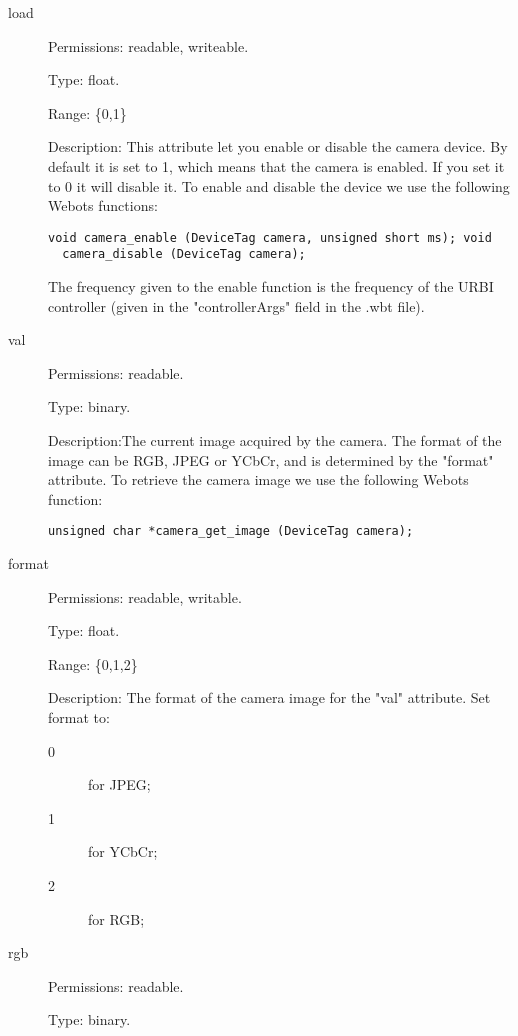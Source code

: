 \noindent
\begin{description}
\item[{load}] Permissions: readable, writeable.


  Type: float.


  Range: \{0,1\}


  Description: This attribute let you enable or disable the camera
  device.  By default it is set to 1, which means that the camera is
  enabled. If you set it to 0 it will disable it.  To enable and
  disable the device we use the following Webots functions:


\begin{lstlisting}[firstnumber=1,]
  void camera_enable (DeviceTag camera, unsigned short ms); void
  camera_disable (DeviceTag camera);
\end{lstlisting}

The frequency given to the enable function is the frequency of the
URBI controller (given in the "controllerArgs" field in the .wbt
file).

\item[{val}] Permissions: readable.


  Type: binary.


  Description:The current image acquired by the camera. The format of
  the image can be RGB, JPEG or YCbCr, and is determined by the
  "format" attribute.  To retrieve the camera image we use the
  following Webots function:


\begin{lstlisting}[firstnumber=1,]
  unsigned char *camera_get_image (DeviceTag camera);
\end{lstlisting}
\item[{format}] Permissions: readable, writable.


  Type: float.


  Range: \{0,1,2\}


  Description: The format of the camera image for the "val"
  attribute. Set format to:

  \begin{description}
  \item[0] for JPEG;
  \item[1] for YCbCr;
  \item[2] for RGB;
  \end{description}

\item[{rgb}] Permissions: readable.


  Type: binary.



\end{description}
